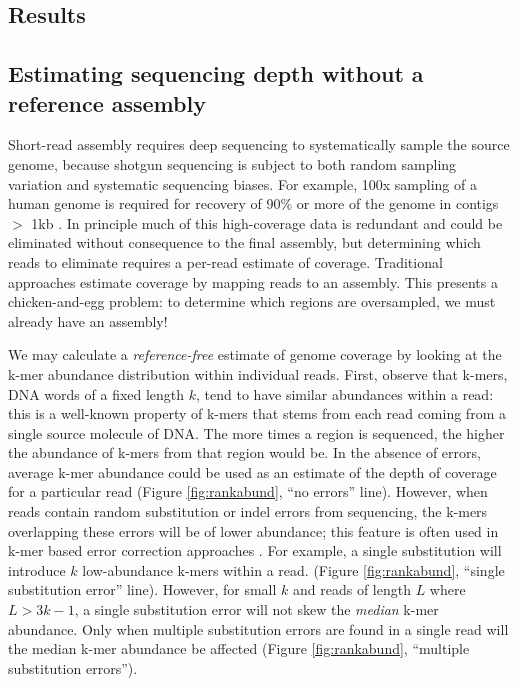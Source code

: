 \documentclass{pnastwo}
\begin{document}
\begin{article}
\section{Results}

\subsection*{Estimating sequencing depth without a reference assembly}

Short-read assembly requires deep sequencing to systematically sample
the source genome, because shotgun sequencing is subject to both
random sampling variation and systematic sequencing biases.  For
example, 100x sampling of a human genome is required for recovery of
90\% or more of the genome in contigs $>$ 1kb \cite{pubmed21187386}.
In principle much of this high-coverage data is redundant and could be
eliminated without consequence to the final assembly, but determining
which reads to eliminate requires a per-read estimate of coverage.
Traditional approaches estimate coverage by mapping reads to an
assembly.  This presents a chicken-and-egg problem: to
determine which regions are oversampled, we must already have an
assembly!

We may calculate a {\em reference-free} estimate of genome coverage by
looking at the k-mer abundance distribution within individual reads.
First, observe that k-mers, DNA words of a fixed length $k$, tend to
have similar abundances within a read: this is a well-known property
of k-mers that stems from each read coming from a single source
molecule of DNA.  The more times a region is sequenced, the higher the
abundance of k-mers from that region would be.  In the absence of
errors, average k-mer abundance could be used as an estimate of the
depth of coverage for a particular read (Figure \ref{fig:rankabund},
``no errors'' line).  However, when reads contain random substitution
or indel errors from sequencing, the k-mers overlapping these errors
will be of lower abundance; this feature is often used in k-mer based
error correction approaches \cite{pubmed21114842}.  For example, a
single substitution will introduce $k$ low-abundance k-mers within a
read.  (Figure \ref{fig:rankabund}, ``single substitution error''
line).  However, for small $k$ and reads of length $L$ where $L >
3k-1$, a single substitution error will not skew the {\em median}
k-mer abundance.  Only when multiple substitution errors are found in
a single read will the median k-mer abundance be affected (Figure
\ref{fig:rankabund}, ``multiple substitution errors'').


\end{article}
\end{document}
